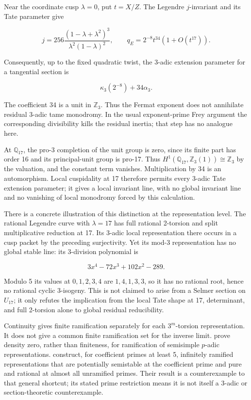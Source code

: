 \begin{remark}\label{rem:frey-three-seventeen-parameter}

Near the coordinate cusp \(\lambda=0\), put \(t=X/Z\). The Legendre
\(j\)-invariant and its Tate parameter give

\[
j=256\frac{(1-\lambda+\lambda^2)^3}
 {\lambda^2(1-\lambda)^2},
\qquad
q_E=2^{-8}t^{34}(1+O(t^{17})).
\]

Consequently, up to the fixed quadratic twist, the 3-adic extension
parameter for a tangential section is

\[
\kappa_3(2^{-8})+34\alpha_3.
\]

The coefficient 34 is a unit in \(\mathbb Z_3\). Thus the Fermat
exponent does not annihilate residual 3-adic tame monodromy. In the
usual exponent-prime Frey argument the corresponding divisibility kills
the residual inertia; that step has no analogue here.

At \(\mathbb Q_{17}\), the pro-3 completion of the unit group is zero,
since its finite part has order 16 and its principal-unit group is
pro-17. Thus \(H^1(\mathbb Q_{17},\mathbb Z_3(1))\cong\mathbb Z_3\) by
the valuation, and the constant term vanishes. Multiplication by 34 is
an automorphism. Local cuspidality at 17 therefore permits every 3-adic
Tate extension parameter; it gives a local invariant line, with no
global invariant line and no vanishing of local monodromy forced by this
calculation.

There is a concrete illustration of this distinction at the
representation level. The rational Legendre curve with \(\lambda=17\)
has full rational 2-torsion and split multiplicative reduction at 17.
Its 3-adic local representation there occurs in a cusp packet by the
preceding surjectivity. Yet its mod-3 representation has no global
stable line: its 3-division polynomial is

\[
3x^4-72x^3+102x^2-289.
\]

Modulo 5 its values at \(0,1,2,3,4\) are \(1,4,1,3,3\), so it has no
rational root, hence no rational cyclic 3-isogeny. This is not claimed
to arise from a Selmer section on \(U_{17}\); it only refutes the
implication from the local Tate shape at 17, determinant, and full
2-torsion alone to global residual reducibility.

Continuity gives finite ramification separately for each \(3^m\)-torsion
representation. It does not give a common finite ramification set for
the inverse limit. \citet[Theorem~1]{KhareRajan2001} prove density zero, rather than
finiteness, for ramification of semisimple \(p\)-adic representations.
\citet[Main Theorem and Remark~1, author p.~3]{KhareLarsenRamakrishna2005} construct, for coefficient primes at least 5,
infinitely ramified representations that are potentially semistable at
the coefficient prime and pure and rational at almost all unramified
primes. Their result is a counterexample to that general shortcut; its
stated prime restriction means it is not itself a 3-adic or
section-theoretic counterexample.


\end{remark}
